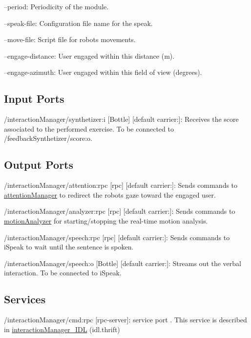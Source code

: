 \begin{DoxyItemize}
\item --period\+: Periodicity of the module.
\item --speak-\/file\+: Configuration file name for the speak.
\item --move-\/file\+: Script file for robot\textquotesingle{}s movements.
\item --engage-\/distance\+: User engaged within this distance (m).
\item --engage-\/azimuth\+: User engaged within this field of view (degrees). 
\end{DoxyItemize}\hypertarget{group__skeletonViewer_inputports_sec}{}\subsection{Input Ports}\label{group__skeletonViewer_inputports_sec}

\begin{DoxyItemize}
\item /interaction\+Manager/synthetizer\+:i \mbox{[}Bottle\mbox{]} \mbox{[}default carrier\+:\mbox{]}\+: Receives the score associated to the performed exercise. To be connected to /feedback\+Synthetizer/score\+:o.
\end{DoxyItemize}\hypertarget{group__skeletonViewer_outputports_sec}{}\subsection{Output Ports}\label{group__skeletonViewer_outputports_sec}

\begin{DoxyItemize}
\item /interaction\+Manager/attention\+:rpc \mbox{[}rpc\mbox{]} \mbox{[}default carrier\+:\mbox{]}\+: Sends commands to \mbox{\hyperlink{group__attentionManager}{attention\+Manager}} to redirect the robot\textquotesingle{}s gaze toward the engaged user.
\item /interaction\+Manager/analyzer\+:rpc \mbox{[}rpc\mbox{]} \mbox{[}default carrier\+:\mbox{]}\+: Sends commands to \mbox{\hyperlink{group__motionAnalyzer}{motion\+Analyzer}} for starting/stopping the real-\/time motion analysis.
\item /interaction\+Manager/speech\+:rpc \mbox{[}rpc\mbox{]} \mbox{[}default carrier\+:\mbox{]}\+: Sends commands to i\+Speak to wait until the sentence is spoken.
\item /interaction\+Manager/speech\+:o \mbox{[}Bottle\mbox{]} \mbox{[}default carrier\+:\mbox{]}\+: Streams out the verbal interaction. To be connected to i\+Speak.
\end{DoxyItemize}\hypertarget{group__skeletonViewer_services_sec}{}\subsection{Services}\label{group__skeletonViewer_services_sec}

\begin{DoxyItemize}
\item /interaction\+Manager/cmd\+:rpc \mbox{[}rpc-\/server\mbox{]}\+: service port . This service is described in \mbox{\hyperlink{classinteractionManager__IDL}{interaction\+Manager\+\_\+\+I\+DL}} (idl.\+thrift) 
\end{DoxyItemize}